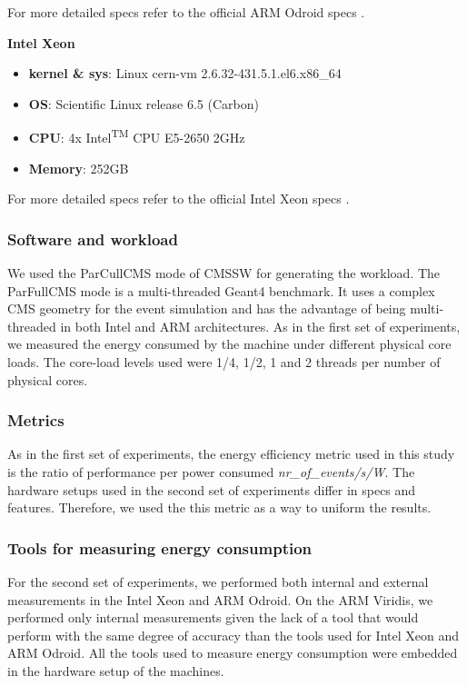 For more detailed specs refer to the official ARM Odroid specs \cite{odroid_specs}.


\vspace{10mm}
\textbf{Intel Xeon}
\begin{itemize}
  \item[] \textbf{kernel \& sys}:  Linux cern-vm 2.6.32-431.5.1.el6.x86\_64
  \item[] \textbf{OS}: Scientific Linux release 6.5 (Carbon)
  \item[] \textbf{CPU}:    4x Intel\textsuperscript{TM} CPU E5-2650 \@2GHz
  \item[] \textbf{Memory}:        252GB
\end{itemize}

For more detailed specs refer to the official Intel Xeon specs \cite{xeon_specs}.


\subsubsection*{Software and workload}
We used the ParCullCMS mode of CMSSW for generating the workload. The ParFullCMS mode is a multi-threaded Geant4 \cite{GEANT4} benchmark. It uses a complex CMS geometry for the event simulation and has the advantage of being multi-threaded in both Intel and ARM architectures. As in the first set of experiments, we measured the energy consumed by the machine under different physical core loads. The core-load levels used were 1/4, 1/2, 1 and 2 threads per number of physical cores. 

\subsubsection*{Metrics}
As in the first set of experiments, the energy efficiency metric used in this study is the ratio of performance per power consumed \textit{nr\_of\_events/s/W}. The hardware setups used in the second set of experiments differ in specs and features. Therefore, we used the this metric as a way to uniform the results.

\subsubsection*{Tools for measuring energy consumption}
For the second set of experiments, we performed both internal and external measurements in the Intel Xeon and ARM Odroid. On the ARM Viridis, we performed only internal measurements given the lack of a tool that would perform with the same degree of accuracy than the tools used for Intel Xeon and ARM Odroid. All the tools used to measure energy consumption were embedded in the hardware setup of the machines.


